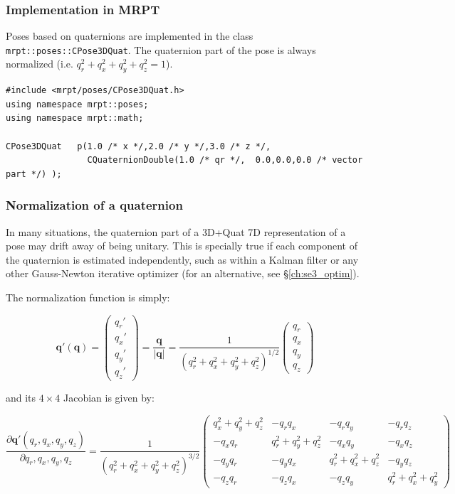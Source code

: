 \documentclass[a4paper,11pt]{report}
\begin{document}
\subsubsection{Implementation in MRPT}

Poses based on quaternions are implemented in the class \texttt{mrpt::poses::CPose3DQuat}.
The quaternion part of the pose is always normalized (i.e. $q_r^2+q_x^2+q_y^2+q_z^2=1$).

\begin{lstlisting}
#include <mrpt/poses/CPose3DQuat.h>
using namespace mrpt::poses;
using namespace mrpt::math;

CPose3DQuat   p(1.0 /* x */,2.0 /* y */,3.0 /* z */,
                CQuaternionDouble(1.0 /* qr */,  0.0,0.0,0.0 /* vector part */) );
\end{lstlisting}


\subsubsection{Normalization of a quaternion}
\label{sect:quat:norm}

In many situations, the quaternion part of a 3D+Quat 7D representation
of a pose may drift away of being unitary.
This is specially true if each component of the quaternion is estimated
independently, such as within a Kalman filter or
any other Gauss-Newton iterative optimizer
(for an alternative, see \S\ref{ch:se3_optim}).

The normalization function is simply:

\begin{equation}
\mathbf{q'}(\mathbf{q})
=
\left(
\begin{array}{c}
 q_r' \\ q_x'\\ q_y'\\ q_z'
\end{array}
\right)
=
\frac{\mathbf{q}}{|\mathbf{q}|}
=
\frac{1}{(q_r^2+q_x^2+q_y^2+q_z^2)^{1/2}}
\left(
\begin{array}{c}
 q_r \\ q_x\\ q_y\\ q_z
\end{array}
\right)
\end{equation}

\noindent and its $4 \times 4$ Jacobian is given by:

\begin{equation}
\frac{\partial \mathbf{q'}(q_r,q_x,q_y,q_z)}{\partial q_r,q_x,q_y,q_z}
=
\frac{1}{(q_r^2+q_x^2+q_y^2+q_z^2)^{3/2}}
\left(
\begin{array}{cccc}
q_x^2 +q_y^2+q_z^2  & -q_r q_x   & -q_r q_y  & -q_r q_z  \\
-q_x q_r & q_r^2 +q_y^2+q_z^2 & -q_x q_y & - q_x q_z \\
-q_y q_r & -q_y q_x &  q_r^2 +q_x^2 +q_z^2 & -q_y q_z \\
-q_z q_r  & -q_z q_x & -q_z q_y  &  q_r^2+q_x^2+q_y^2
\end{array}
\right)
\end{equation}
\end{document}
